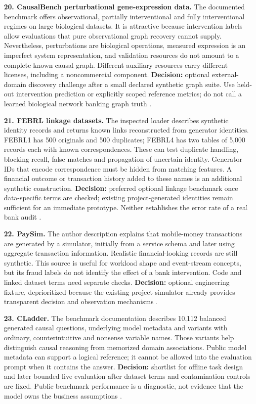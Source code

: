 \textbf{20. CausalBench perturbational gene-expression data.} The
documented benchmark offers observational, partially interventional and
fully interventional regimes on large biological datasets. It is
attractive because intervention labels allow evaluations that pure
observational graph recovery cannot supply. Nevertheless, perturbations
are biological operations, measured expression is an imperfect system
representation, and validation resources do not amount to a complete
known causal graph. Different auxiliary resources carry different
licenses, including a noncommercial component. \textbf{Decision:}
optional external-domain discovery challenge after a small declared
synthetic graph suite. Use held-out intervention prediction or
explicitly scoped reference metrics; do not call a learned biological
network banking graph truth \citep{pd15_causalbench_pinned}.

\textbf{21. FEBRL linkage datasets.} The inspected loader describes
synthetic identity records and returns known links reconstructed from
generator identities. FEBRL1 has 500 originals and 500 duplicates;
FEBRL4 has two tables of 5,000 records each with known correspondences.
These can test duplicate handling, blocking recall, false matches and
propagation of uncertain identity. Generator IDs that encode
correspondence must be hidden from matching features. A financial
outcome or transaction history added to these names is an additional
synthetic construction. \textbf{Decision:} preferred optional linkage
benchmark once data-specific terms are checked; existing
project-generated identities remain sufficient for an immediate
prototype. Neither establishes the error rate of a real bank audit
\citep{pd15_febrl_source}.

\textbf{22. PaySim.} The author description explains that mobile-money
transactions are generated by a simulator, initially from a service
schema and later using aggregate transaction information. Realistic
financial-looking records are still synthetic. This source is useful for
workload shape and event-stream concepts, but its fraud labels do not
identify the effect of a bank intervention. Code and linked dataset
terms need separate checks. \textbf{Decision:} optional engineering
fixture, deprioritized because the existing project simulator already
provides transparent decision and observation mechanisms
\citep{pd15_paysim_pinned}.

\textbf{23. CLadder.} The benchmark documentation describes 10,112
balanced generated causal questions, underlying model metadata and
variants with ordinary, counterintuitive and nonsense variable names.
Those variants help distinguish causal reasoning from memorized domain
associations. Public model metadata can support a logical reference; it
cannot be allowed into the evaluation prompt when it contains the
answer. \textbf{Decision:} shortlist for offline task design and later
bounded live evaluation after dataset terms and contamination controls
are fixed. Public benchmark performance is a diagnostic, not evidence
that the model owns the business assumptions
\citep{pd15_cladder_pinned}.

